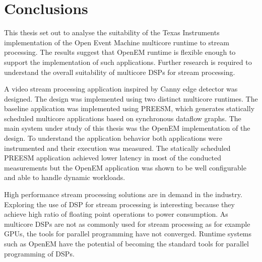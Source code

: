 \chapter{Conclusions}
\label{chapter:conclusion}
This thesis set out to analyse the suitability of the Texas Instruments implementation of the Open Event Machine multicore runtime to stream processing. The results suggest that OpenEM runtime is flexible enough to support the implementation of such applications. Further research is required to understand the overall suitability of multicore DSPs for stream processing.

A video stream processing application inspired by Canny edge detector was designed. The design was implemented using two distinct multicore runtimes. The baseline application was implemented using PREESM, which generates statically scheduled multicore applications based on synchronous dataflow graphs. The main system under study of this thesis was the OpenEM implementation of the design. To understand the application behavior both applications were instrumented and their execution was measured. The statically scheduled PREESM application achieved lower latency in most of the conducted measurements but the OpenEM application was shown to be well configurable and able to handle dynamic workloads.

High performance stream processing solutions are in demand in the industry. Exploring the use of DSP for stream processing is interesting because they achieve high ratio of floating point operations to power consumption. As multicore DSPs are not as commonly used for stream processing as for example GPUs, the tools for parallel programming have not converged. Runtime systems such as OpenEM have the potential of becoming the standard tools for parallel programming of DSPs.
